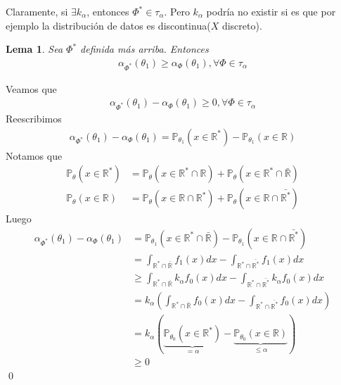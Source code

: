\documentclass[10pt]{article}
\theoremstyle{plain}
\newtheorem{lem}{Lema}
\renewenvironment{proof}{{\bfseries \noindent Demostración}}{ \qed \\}
\theoremstyle{definition}
\begin{document}
Claramente, si $\exists k_{\alpha}$, entonces $\Phi^* \in \tau_{\alpha}$. Pero $k_{\alpha}$ podría no existir si es que por ejemplo la distribución de datos es discontinua($X$ discreto).
\begin{lem}
Sea $\Phi^*$ definida más arriba. Entonces
\begin{align*}
\alpha_{\Phi^*}(\theta_{1}) \ge \alpha_{\Phi}(\theta_{1}), \forall \Phi \in \tau_{\alpha}
\end{align*}
\end{lem}
\begin{proof}
Veamos que
\begin{align*}
\alpha_{\Phi^*}(\theta_{1}) - \alpha_{\Phi}(\theta_{1}) \ge 0, \forall \Phi \in \tau_{\alpha}
\end{align*}
Reescribimos
\begin{align*}
\alpha_{\Phi^*}(\theta_{1}) - \alpha_{\Phi}(\theta_{1}) = \mathbb{P}_{\theta_{1}}(x\in\mathbb{R}^*) -\mathbb{P}_{\theta_{1}}(x\in\mathbb{R})
\end{align*}
Notamos que 
\begin{align*}
\mathbb{P}_{\theta}(x \in \mathbb{R}^*) &= \mathbb{P}_{\theta}(x\in \mathbb{R}^* \cap \mathbb{R}) + \mathbb{P}_{\theta}(x\in \mathbb{R}^* \cap \bar{\mathbb{R}})\\
\mathbb{P}_{\theta}(x \in \mathbb{R}) &= \mathbb{P}_{\theta}(x\in \mathbb{R} \cap \mathbb{R}^*) + \mathbb{P}_{\theta}(x\in \mathbb{R} \cap \bar{\mathbb{R}^*})
\end{align*}
Luego
\begin{align*}
\alpha_{\Phi^*}(\theta_{1}) - \alpha_{\Phi}(\theta_{1}) &= \mathbb{P}_{\theta_{1}}(x\in \mathbb{R}^* \cap \bar{\mathbb{R}}) - \mathbb{P}_{\theta_{1}}(x\in \mathbb{R} \cap \bar{\mathbb{R}^*})\\
&=\int_{\mathbb{R}^* \cap \bar{\mathbb{R}}} {f_{1}(x)dx} - \int_{\mathbb{R}^* \cap \bar{\mathbb{R}^*}} {f_{1}(x)dx}\\
&\ge \int_{\mathbb{R}^* \cap \bar{\mathbb{R}}} {k_{\alpha}f_{0}(x)dx} - \int_{\mathbb{R}^* \cap \bar{\mathbb{R}^*}} {k_{\alpha}f_{0}(x)dx}\\
&= k_{\alpha}\left(\int_{\mathbb{R}^* \cap \bar{\mathbb{R}}} {f_{0}(x)dx} - \int_{\mathbb{R}^* \cap \bar{\mathbb{R}^*}} {f_{0}(x)dx}\right)\\
&=k_{\alpha}\left(\underbrace{\mathbb{P}_{\theta_{0}}(x\in\mathbb{R}^*)}_{=\alpha}-\underbrace{\mathbb{P}_{\theta_{0}}(x\in\mathbb{R})}_{\le \alpha}\right)\\
&\ge 0
\end{align*}
\end{proof}
\end{document}
